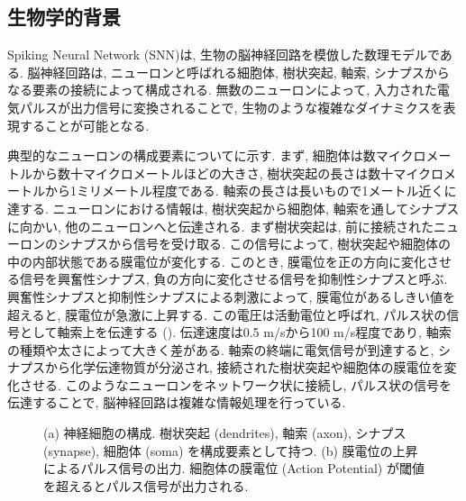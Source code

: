 \subsection{生物学的背景}
Spiking Neural Network (SNN)は, 生物の脳神経回路を模倣した数理モデルである.
脳神経回路は, ニューロンと呼ばれる細胞体, 樹状突起, 軸索, シナプスからなる要素の接続によって構成される.
無数のニューロンによって, 入力された電気パルスが出力信号に変換されることで, 生物のような複雑なダイナミクスを表現することが可能となる.

典型的なニューロンの構成要素についてに示す.
まず, 細胞体は数マイクロメートルから数十マイクロメートルほどの大きさ, 樹状突起の長さは数十マイクロメートルから1ミリメートル程度である.
軸索の長さは長いもので1メートル近くに達する.
ニューロンにおける情報は, 樹状突起から細胞体, 軸索を通してシナプスに向かい, 他のニューロンへと伝達される.
まず樹状突起は, 前に接続されたニューロンのシナプスから信号を受け取る.
この信号によって, 樹状突起や細胞体の中の内部状態である膜電位が変化する.
このとき, 膜電位を正の方向に変化させる信号を興奮性シナプス, 負の方向に変化させる信号を抑制性シナプスと呼ぶ.
興奮性シナプスと抑制性シナプスによる刺激によって, 膜電位があるしきい値を超えると, 膜電位が急激に上昇する.
この電圧は活動電位と呼ばれ, パルス状の信号として軸索上を伝達する ().
伝達速度は0.5 m/sから100 m/s程度であり, 軸索の種類や太さによって大きく差がある.
軸索の終端に電気信号が到達すると, シナプスから化学伝達物質が分泌され, 接続された樹状突起や細胞体の膜電位を変化させる.
このようなニューロンをネットワーク状に接続し, パルス状の信号を伝達することで, 脳神経回路は複雑な情報処理を行っている.

\begin{figure}[htb]
    \centering

    \begin{minipage}{0.497\textwidth}
        \centering
        
        \label{fig:brain:neuron}
    \end{minipage}
    \hspace{0.02\textwidth}
    \begin{minipage}{0.3474\textwidth}
        \centering
        
        \label{fig:brain:actionpotential}
    \end{minipage}

    \caption[脳神経回路の模式図]{
        \cite{lobo2020spiking}
        (a) 神経細胞の構成. 
        樹状突起 (dendrites), 軸索 (axon), シナプス (synapse), 細胞体 (soma) を構成要素として持つ.
        (b) 膜電位の上昇によるパルス信号の出力.
        細胞体の膜電位 (Action Potential) が閾値を超えるとパルス信号が出力される.
    }
\end{figure}